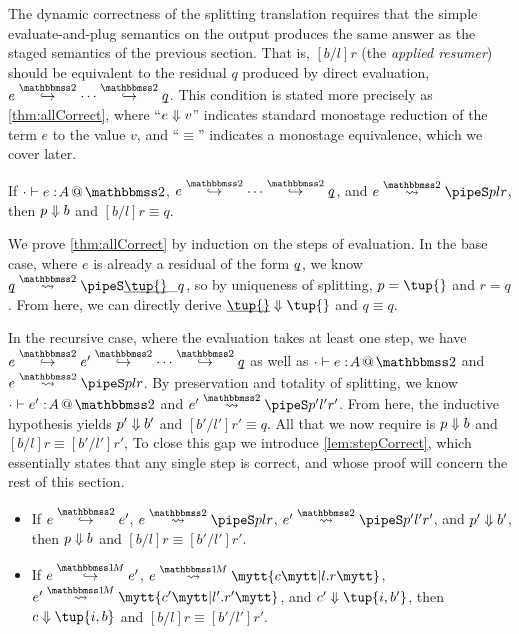 \begin{abstrsyn}
The dynamic correctness of the splitting translation requires that the simple 
evaluate-and-plug semantics on the output produces the same answer as the staged semantics of the previous section.
That is, $[b/l]r$ (the \emph{applied resumer}) should be equivalent 
to the residual $q$ produced by direct evaluation, $e \stepsym \bbtwo \cdots \stepsym \bbtwo \exv q$.
This condition is stated more precisely as \ref{thm:allCorrect},
where ``${e} \Downarrow {v}$'' indicates standard monostage reduction of the term $e$ to the value $v$,
and ``$\equiv$'' indicates a monostage equivalence, which we cover later.

\begin{theorem} 
\label{thm:allCorrect}
If $\typestwo [\cdot] e A$, $e \stepsym \bbtwo \cdots \stepsym \bbtwo \exv q$, and $\splittwo e A p l r$,
then ${p} \Downarrow {b}$ and $[b/l]r \equiv q$.
\end{theorem}

We prove \ref{thm:allCorrect} by induction on the steps of evaluation.  
In the base case, where $e$ is already a residual of the form $\underline{\smash{q}}$, we know
$\splittwo {\exv q} A {\exv{\tup{}}} \_ q$, so by uniqueness of splitting, 
$p = \tup{}$ and $r = q$.
From here, we can directly derive $\reduce {\exv {\tup {}}} {\tup {}}$ and $q \equiv q$.

In the recursive case, where the evaluation takes at least one step, we have 
$e \stepsym \bbtwo e' \stepsym \bbtwo \cdots \stepsym \bbtwo \exv q$
as well as \mbox{$\typestwo [\cdot] e A$} 
and \mbox{$\splittwo e A p l r$}.
By preservation and totality of splitting, we know $\typestwo [\cdot] {e'} A$ and $\splittwo {e'} A {p'} {l'} {r'}$.
From here, the inductive hypothesis yields ${p'} \Downarrow {b'}$ and $[b'/l']r' \equiv q$.
All that we now require is ${p} \Downarrow {b}$ and $[b/l]r \equiv [b'/l']r'$,
To close this gap we introduce \ref{lem:stepCorrect}, 
which essentially states that any single step is correct,
and whose proof will concern the rest of this section.

\begin{lemma} 
\label{lem:stepCorrect}
\vspace{-0.75em}
\begin{itemize} 
\item If $e \stepsym \bbtwo e'$, $\splittwo e A p  l r$, $\splittwo {e'} A {p'} {l'} {r'}$, and ${p'} \Downarrow {b'}$,
then ${p} \Downarrow {b}$ and $[b/l]r \equiv [b'/l']r'$.
\item If $e \stepsym \bbonem e'$, $\splitone e A c {l.r}$, $\splitone {e'} A {c'} {l'.r'}$, and $\reduce {c'} {\tup{i,b'}}$,
then $\reduce c {\tup {i,b}}$ and $[b/l]r \equiv [b'/l']r'$.
\end{itemize}
\end{lemma}


\end{abstrsyn}
